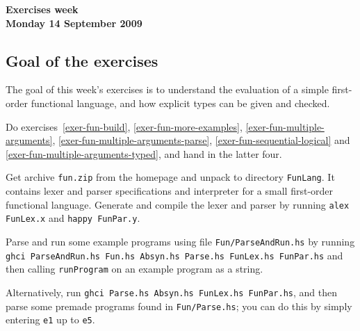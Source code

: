 \documentclass[a4paper]{article}
\begin{document}
\begin{center}
{\Large\bf Exercises week \\[1ex]
Monday 14 September 2009}\\[1ex]
\end{center}

\subsection*{Goal of the exercises}

The goal of this week's exercises is to understand the evaluation of a
simple first-order functional language, and how explicit types can be
given and checked.

Do exercises~\ref{exer-fun-build}, \ref{exer-fun-more-examples},
\ref{exer-fun-multiple-arguments},
\ref{exer-fun-multiple-arguments-parse},
\ref{exer-fun-sequential-logical} and
\ref{exer-fun-multiple-arguments-typed}, and hand in the latter four.

\begin{exercise}\label{exer-fun-build}
  Get archive \texttt{fun.zip} from the homepage and unpack to
  directory \texttt{FunLang}\@.  It contains lexer and parser
  specifications and interpreter for a small first-order functional
  language.  Generate and compile the lexer and parser by running
  \texttt{alex FunLex.x} and \texttt{happy FunPar.y}\@.
  
  Parse and run some example programs using
  file \texttt{Fun/ParseAndRun.hs} by running \texttt{ghci ParseAndRun.hs Fun.hs Absyn.hs Parse.hs FunLex.hs FunPar.hs} and then calling \texttt{runProgram} on an example program as a string.
  
  
  Alternatively, run \texttt{ghci Parse.hs Absyn.hs FunLex.hs FunPar.hs}, and then parse some premade programs found in \texttt{Fun/Parse.hs}; you can do this by simply entering \texttt{e1} up to \texttt{e5}.
\end{exercise}
 
\end{document}
